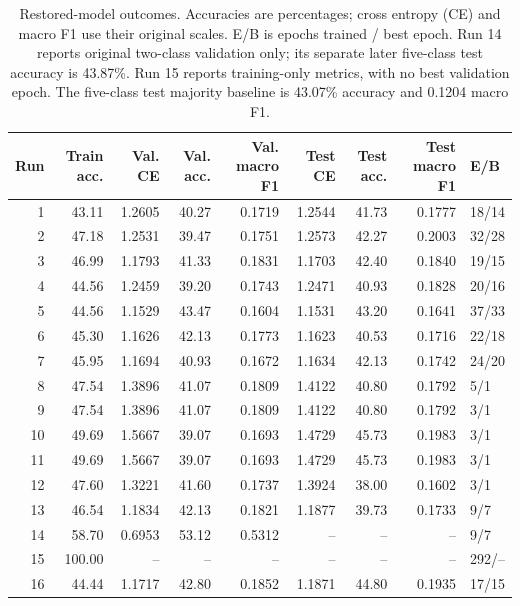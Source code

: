 \documentclass[11pt,letterpaper]{article}
\begin{document}
\begin{table}[!t]
\caption{Restored-model outcomes. Accuracies are percentages; cross entropy (CE) and macro F1 use their original scales. E/B is epochs trained / best epoch. Run 14 reports original two-class validation only; its separate later five-class test accuracy is 43.87\%. Run 15 reports training-only metrics, with no best validation epoch. The five-class test majority baseline is 43.07\% accuracy and 0.1204 macro F1.}
\label{tab:outcomes}
\centering\small
\setlength{\tabcolsep}{3pt}
\renewcommand{\arraystretch}{1.08}
\begin{tabular*}{\textwidth}{@{\extracolsep{\fill}}rrrrrrrrl@{}}
\toprule
Run & Train acc. & Val. CE & Val. acc. & Val. macro F1 & Test CE & Test acc. & Test macro F1 & E/B \\
\midrule
1 & 43.11 & 1.2605 & 40.27 & 0.1719 & 1.2544 & 41.73 & 0.1777 & 18/14 \\
2 & 47.18 & 1.2531 & 39.47 & 0.1751 & 1.2573 & 42.27 & 0.2003 & 32/28 \\
3 & 46.99 & 1.1793 & 41.33 & 0.1831 & 1.1703 & 42.40 & 0.1840 & 19/15 \\
4 & 44.56 & 1.2459 & 39.20 & 0.1743 & 1.2471 & 40.93 & 0.1828 & 20/16 \\
5 & 44.56 & 1.1529 & 43.47 & 0.1604 & 1.1531 & 43.20 & 0.1641 & 37/33 \\
6 & 45.30 & 1.1626 & 42.13 & 0.1773 & 1.1623 & 40.53 & 0.1716 & 22/18 \\
7 & 45.95 & 1.1694 & 40.93 & 0.1672 & 1.1634 & 42.13 & 0.1742 & 24/20 \\
8 & 47.54 & 1.3896 & 41.07 & 0.1809 & 1.4122 & 40.80 & 0.1792 & 5/1 \\
9 & 47.54 & 1.3896 & 41.07 & 0.1809 & 1.4122 & 40.80 & 0.1792 & 3/1 \\
10 & 49.69 & 1.5667 & 39.07 & 0.1693 & 1.4729 & 45.73 & 0.1983 & 3/1 \\
11 & 49.69 & 1.5667 & 39.07 & 0.1693 & 1.4729 & 45.73 & 0.1983 & 3/1 \\
12 & 47.60 & 1.3221 & 41.60 & 0.1737 & 1.3924 & 38.00 & 0.1602 & 3/1 \\
13 & 46.54 & 1.1834 & 42.13 & 0.1821 & 1.1877 & 39.73 & 0.1733 & 9/7 \\
14 & 58.70 & 0.6953 & 53.12 & 0.5312 & -- & -- & -- & 9/7 \\
15 & 100.00 & -- & -- & -- & -- & -- & -- & 292/-- \\
16 & 44.44 & 1.1717 & 42.80 & 0.1852 & 1.1871 & 44.80 & 0.1935 & 17/15 \\

\end{tabular*}
\end{table}
\end{document}

